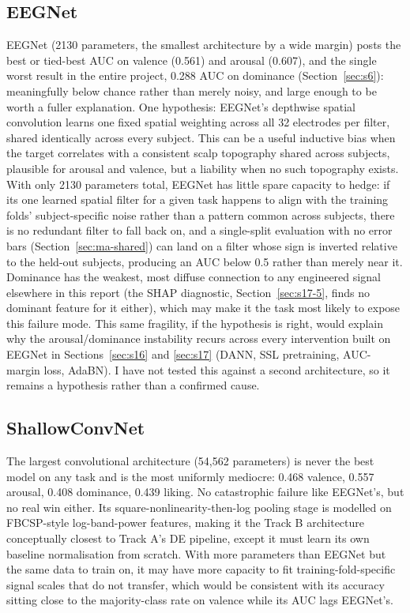 \documentclass[11pt]{report}
\begin{document}
\subsection{EEGNet}
\label{sec:ma-eegnet}
EEGNet (2130 parameters, the smallest architecture by a wide margin) posts
the best or tied-best AUC on valence (0.561) and arousal (0.607), and the
single worst result in the entire project, 0.288 AUC on dominance
(Section~\ref{sec:s6}): meaningfully below chance rather than merely noisy,
and large enough to be worth a fuller explanation. One hypothesis: EEGNet's
depthwise spatial convolution learns one fixed spatial weighting across all
32 electrodes per filter, shared identically across every subject. This can
be a useful inductive bias when the target correlates with a consistent
scalp topography shared across subjects, plausible for arousal and valence,
but a liability when no such topography exists. With only 2130 parameters
total, EEGNet has little spare capacity to hedge: if its one learned
spatial filter for a given task happens to align with the training folds'
subject-specific noise rather than a pattern common across subjects, there
is no redundant filter to fall back on, and a single-split evaluation with
no error bars (Section~\ref{sec:ma-shared}) can land on a filter whose sign
is inverted relative to the held-out subjects, producing an AUC below 0.5
rather than merely near it. Dominance has the weakest, most diffuse
connection to any engineered signal elsewhere in this report (the SHAP
diagnostic, Section~\ref{sec:s17-5}, finds no dominant feature for it
either), which may make it the task most likely to expose this failure
mode. This same fragility, if the hypothesis is right, would explain why
the arousal/dominance instability recurs across every intervention built on
EEGNet in Sections~\ref{sec:s16} and \ref{sec:s17} (DANN, SSL pretraining,
AUC-margin loss, AdaBN). I have not tested this against a second
architecture, so it remains a hypothesis rather than a confirmed cause.

\subsection{ShallowConvNet}
\label{sec:ma-shallow}
The largest convolutional architecture (54{,}562 parameters) is never the
best model on any task and is the most uniformly mediocre: 0.468 valence,
0.557 arousal, 0.408 dominance, 0.439 liking. No catastrophic failure like
EEGNet's, but no real win either. Its square-nonlinearity-then-log pooling
stage is modelled on FBCSP-style log-band-power features, making it the
Track B architecture conceptually closest to Track A's DE pipeline, except
it must learn its own baseline normalisation from scratch. With more
parameters than EEGNet but the same data to train on, it may have more
capacity to fit training-fold-specific signal scales that do not transfer,
which would be consistent with its accuracy sitting close to the
majority-class rate on valence while its AUC lags EEGNet's.
\end{document}
